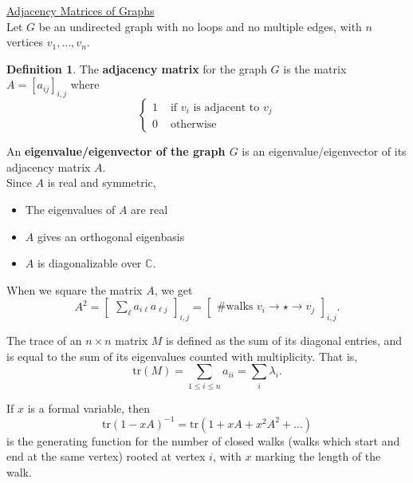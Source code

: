 \documentclass[12pt]{article}
\newcommand{\CC}{\mathbb{C}}
\newcommand{\tr}{\text{tr}}
\theoremstyle{definition}
\newtheorem*{defn}{Definition}
\begin{document}
\underline{Adjacency Matrices of Graphs} \\

Let $G$ be an undirected graph with no loops and no multiple edges, with $n$ vertices $v_1, \dots, v_n$.

\begin{defn}
	The \textbf{adjacency matrix} for the graph $G$ is the matrix $A = [a_{ij}]_{i, j}$ where
	$$ \begin{cases}
	1 & \text{ if $v_i$ is adjacent to $v_j$} \\
	0 & \text{ otherwise}
	\end{cases} $$
\end{defn}

An \textbf{eigenvalue/eigenvector of the graph $G$} is an eigenvalue/eigenvector of its adjacency matrix $A$. \\

Since $A$ is real and symmetric,
\begin{itemize}
	\item The eigenvalues of $A$ are real
	\item $A$ gives an orthogonal eigenbasis
	\item $A$ is diagonalizable over $\CC$.
\end{itemize}

When we square the matrix $A$, we get
$$A^2 = \begin{bmatrix} \sum_{\ell} a_{i \ell} a_{\ell j} \end{bmatrix}_{i, j} = \begin{bmatrix} \text{\# walks } v_i \rightarrow \star \rightarrow v_j \end{bmatrix}_{i, j}.$$

The trace of an $n \times n$ matrix $M$ is defined as the sum of its diagonal entries, and is equal to the sum of its eigenvalues counted with multiplicity. That is,
$$\tr(M) = \sum_{1 \leq i \leq n} a_{ii} = \sum_{i} \lambda_i.$$

If $x$ is a formal variable, then 
$$\tr(1 - xA)^{-1} = \tr(1 + xA + x^2A^2 + \dots)$$
is the generating function for the number of closed walks (walks which start and end at the same vertex) rooted at vertex $i$, with $x$ marking the length of the walk. \\
\end{document}
